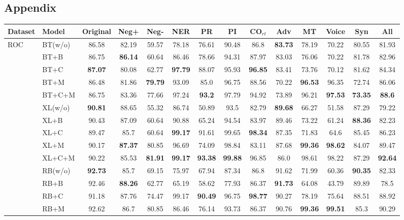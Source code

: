 \documentclass{ecai}  %
\begin{document}
\appendix
\begin{multicols}{2}
\newpage
\section*{Appendix}
\begin{center}
\begin{table}[H]
\small
\centering
\captionsetup{width=\textwidth}
\begin{tabularx}{\textwidth}{ll|c|ccccccccccc}\hline
\toprule  
\textbf{Dataset}&\textbf{Model}&\textbf{Original} &\textbf{Neg+} & \textbf{Neg-} &\textbf{NER} &\textbf{PR} &\textbf{PI} 
                                               &\textbf{CO$_{rt}$}&\textbf{Adv}&\textbf{MT}&\textbf{Voice}&\textbf{Syn}&\textbf{All}
                                               \\ 
 \midrule
 \multirow{15}{*}{ROC} 
 		    
                &  BT(w/o) &86.58&82.19&59.57&78.18&76.61&90.48&86.8&\bf{83.73}&78.19&70.22&80.55&81.93
                						\\ 
		&  BT+B & 86.75&\bf{86.14}&60.64&86.46&78.66&94.31&87.97&83.03&76.06&70.22&81.78&82.96
 						        \\ 
		&  BT+C & \bf{87.07}&80.08&62.77&\bf{97.79}&88.07&95.93&\bf{96.85}&83.41&73.76&70.12&81.62&84.34
 						        \\ 
		   & BT+M & 86.48&81.86&\bf{79.79}&93.09&85.0&96.75&88.56&70.22&\bf{96.53}&96.35&72.74&86.06
 						       \\ 
		   & BT+C+M& 86.75&83.36&77.66&97.24&\bf{93.2}&97.79&94.92&73.89&96.21&\bf{97.53}&\bf{73.35}&\bf{88.6}
		
 					     	       \\ \cmidrule{2-14}
						          
		&  XL(w/o) & \bf{90.81}&88.65&55.32&86.74&50.89&93.5&82.79&\bf{89.68}&66.27&51.58&87.29&79.22
                						\\ 
		&  XL+B & 90.43&87.09&60.64&90.88&65.24&94.54&83.97&89.46&73.22&61.24&\bf{88.36}&82.23
 						        \\ 
		&  XL+C & 89.47&85.7&60.64&\bf{99.17}&91.61&99.65&\bf{98.34}&87.35&71.83&64.6&85.45&86.23
 						        \\ 
		   & XL+M & 90.17&\bf{87.37}&80.85&96.69&74.09&98.84&83.11&87.68&\bf{99.36}&\bf{98.62}&84.07&89.47

 						       \\ 
		   & XL+C+M& 90.22&85.53&\bf{81.91}&\bf{99.17}&\bf{93.38}&\bf{99.88}&96.85&86.0&98.61&98.22&87.29&\bf{92.64}
 					     	       \\ \cmidrule{2-14}
	&  RB(w/o) & \bf{92.73} &85.7&69.15&75.97&67.94&87.34&86.8&91.62&71.99&60.36&\bf{90.35}&82.33
                						\\ 
		&  RB+B & 92.46&\bf{88.26}&62.77&65.19&58.62&77.93&86.37&\bf{91.73}&64.08&43.79&89.89&78.5
 						        \\ 
		&  RB+C & 91.18 &87.76&74.47&99.17&\bf{90.49}&96.75&\bf{98.77}&90.27&78.19&75.64&88.51&88.92
 						        \\ 
		   & RB+M &92.62 &86.7&80.85&86.46&76.14&93.73&86.37&90.76&\bf{99.36}&\bf{99.51}&85.3&90.29


\end{tabularx}
\end{table}
\end{center}
\end{multicols}
\end{document}
